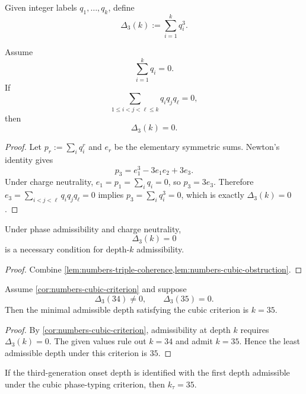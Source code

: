 \begin{definition}
\label{def:numbers-cubic-defect}
Given integer labels \(q_1,\dots,q_k\), define
\[
  \Delta_3(k):=\sum_{i=1}^k q_i^3.
\]
\end{definition}

\begin{lemma}
\label{lem:numbers-cubic-obstruction}
Assume
\[
  \sum_{i=1}^k q_i=0.
\]
If
\[
  \sum_{1\le i<j<\ell\le k} q_iq_jq_\ell=0,
\]
then
\[
  \Delta_3(k)=0.
\]
\end{lemma}

\begin{proof}
Let \(p_r:=\sum_i q_i^r\) and \(e_r\) be the elementary symmetric sums.
Newton's identity gives
\[
  p_3=e_1^3-3e_1e_2+3e_3.
\]
Under charge neutrality, \(e_1=p_1=\sum_i q_i=0\), so \(p_3=3e_3\).
Therefore \(e_3=\sum_{i<j<\ell}q_iq_jq_\ell=0\) implies
\(p_3=\sum_i q_i^3=0\), which is exactly \(\Delta_3(k)=0\).
\end{proof}

\begin{corollary}
\label{cor:numbers-cubic-criterion}
Under phase admissibility and charge neutrality,
\[
  \Delta_3(k)=0
\]
is a necessary condition for depth-\(k\) admissibility.
\end{corollary}

\begin{proof}
Combine \cref{lem:numbers-triple-coherence,lem:numbers-cubic-obstruction}.
\end{proof}

\begin{proposition}
\label{prop:numbers-cubic-k35}
Assume \cref{cor:numbers-cubic-criterion} and suppose
\[
  \Delta_3(34)\neq0,
  \qquad
  \Delta_3(35)=0.
\]
Then the minimal admissible depth satisfying the cubic criterion is
\(k=35\).
\end{proposition}

\begin{proof}
By \cref{cor:numbers-cubic-criterion}, admissibility at depth \(k\)
requires \(\Delta_3(k)=0\).
The given values rule out \(k=34\) and admit \(k=35\).
Hence the least admissible depth under this criterion is \(35\).
\end{proof}

\begin{corollary}
\label{cor:numbers-k-tau-35}
If the third-generation onset depth is identified with the first depth
admissible under the cubic phase-typing criterion, then \(k_\tau=35\).
\end{corollary}

